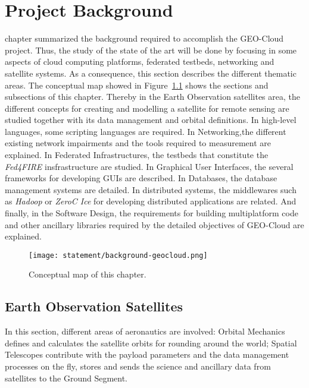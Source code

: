 \chapter{Project Background}
\label{chap:antecedentes}


 chapter summarized the background required to accomplish the
GEO-Cloud project. Thus, the study of the state of the art will be done by
focusing in some aspects of cloud computing platforms, federated testbeds,
networking and satellite systems. As a consequence, this section describes the different thematic areas.
The conceptual map showed in Figure~\ref{fig:intr-conceptual-map} shows the
sections and subsections of this chapter. Thereby in the Earth Observation
satellites area, the different concepts for creating and modelling a satellite
for remote sensing are studied together with its data management and orbital
definitions. In high-level languages, some scripting languages are required. In
Networking,the different existing network impairments and the tools required to
measurement are explained. In Federated Infrastructures, the testbeds that
constitute the \emph{Fed4FIRE} insfrastructure are studied. In Graphical User Interfaces, the several
frameworks for developing \acp{GUI} are described. In Databases, the database
management systems are detailed. In distributed systems, the middlewares such as \emph{Hadoop} or
\emph{ZeroC Ice} for developing distributed applications are related. And finally, in
the Software Design, the requirements for building multiplatform code and other
ancillary libraries required by the detailed objectives of GEO-Cloud are explained.

\begin{figure}[!h]
\begin{center}
\texttt{[image: statement/background-geocloud.png]}
\caption{Conceptual map of this chapter.}
\label{fig:intr-conceptual-map}
\end{center}
\end{figure}


\section{Earth Observation Satellites}

In this section, different areas of aeronautics are involved: Orbital
Mechanics defines and calculates the satellite orbits for rounding around
the world;  Spatial Telescopes  contribute with the payload parameters and the
data management processes on the fly, stores and sends the science and ancillary
data from satellites to the Ground Segment.

